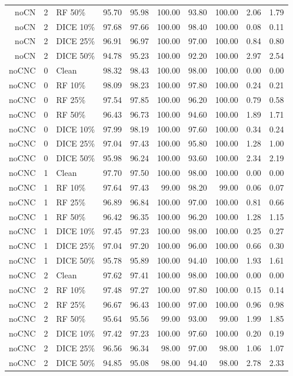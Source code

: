 {\begin{longtable}{rllrrrrrrr}
noCN & 2 & RF 50\% & 95.70 & 95.98 & 100.00 & 93.80 & 100.00 & 2.06 & 1.79 \\
noCN & 2 & DICE 10\% & 97.68 & 97.66 & 100.00 & 98.40 & 100.00 & 0.08 & 0.11 \\
noCN & 2 & DICE 25\% & 96.91 & 96.97 & 100.00 & 97.00 & 100.00 & 0.84 & 0.80 \\
noCN & 2 & DICE 50\% & 94.78 & 95.23 & 100.00 & 92.20 & 100.00 & 2.97 & 2.54 \\
noCNC & 0 & Clean & 98.32 & 98.43 & 100.00 & 98.00 & 100.00 & 0.00 & 0.00 \\
noCNC & 0 & RF 10\% & 98.09 & 98.23 & 100.00 & 97.80 & 100.00 & 0.24 & 0.21 \\
noCNC & 0 & RF 25\% & 97.54 & 97.85 & 100.00 & 96.20 & 100.00 & 0.79 & 0.58 \\
noCNC & 0 & RF 50\% & 96.43 & 96.73 & 100.00 & 94.60 & 100.00 & 1.89 & 1.71 \\
noCNC & 0 & DICE 10\% & 97.99 & 98.19 & 100.00 & 97.60 & 100.00 & 0.34 & 0.24 \\
noCNC & 0 & DICE 25\% & 97.04 & 97.43 & 100.00 & 95.80 & 100.00 & 1.28 & 1.00 \\
noCNC & 0 & DICE 50\% & 95.98 & 96.24 & 100.00 & 93.60 & 100.00 & 2.34 & 2.19 \\
noCNC & 1 & Clean & 97.70 & 97.50 & 100.00 & 98.00 & 100.00 & 0.00 & 0.00 \\
noCNC & 1 & RF 10\% & 97.64 & 97.43 & 99.00 & 98.20 & 99.00 & 0.06 & 0.07 \\
noCNC & 1 & RF 25\% & 96.89 & 96.84 & 100.00 & 97.00 & 100.00 & 0.81 & 0.66 \\
noCNC & 1 & RF 50\% & 96.42 & 96.35 & 100.00 & 96.20 & 100.00 & 1.28 & 1.15 \\
noCNC & 1 & DICE 10\% & 97.45 & 97.23 & 100.00 & 98.00 & 100.00 & 0.25 & 0.27 \\
noCNC & 1 & DICE 25\% & 97.04 & 97.20 & 100.00 & 96.00 & 100.00 & 0.66 & 0.30 \\
noCNC & 1 & DICE 50\% & 95.78 & 95.89 & 100.00 & 94.40 & 100.00 & 1.93 & 1.61 \\
noCNC & 2 & Clean & 97.62 & 97.41 & 100.00 & 98.00 & 100.00 & 0.00 & 0.00 \\
noCNC & 2 & RF 10\% & 97.48 & 97.27 & 100.00 & 97.80 & 100.00 & 0.15 & 0.14 \\
noCNC & 2 & RF 25\% & 96.67 & 96.43 & 100.00 & 97.00 & 100.00 & 0.96 & 0.98 \\
noCNC & 2 & RF 50\% & 95.64 & 95.56 & 99.00 & 93.00 & 99.00 & 1.99 & 1.85 \\
noCNC & 2 & DICE 10\% & 97.42 & 97.23 & 100.00 & 97.60 & 100.00 & 0.20 & 0.19 \\
noCNC & 2 & DICE 25\% & 96.56 & 96.34 & 98.00 & 97.00 & 98.00 & 1.06 & 1.07 \\
noCNC & 2 & DICE 50\% & 94.85 & 95.08 & 98.00 & 94.40 & 98.00 & 2.78 & 2.33 \\
\end{longtable}
}

